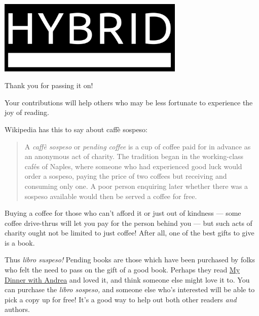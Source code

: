 \documentclass[12pt,letterpaper]{article}
\begin{document}
\thispagestyle{empty}

\begin{center}
\noindent\includegraphics[width=3.5in]{logo}

  \vspace{1cm}

{\huge Thank you for passing it on!}
\end{center}

Your contributions will help others who may be less fortunate to experience the joy of reading.

Wikipedia has this to say about caff\`{e} sospeso:

\begin{quote}
  A \emph{caff\`{e} sospeso} or \emph{pending coffee} is a cup of coffee paid for in advance as an anonymous act of charity. The tradition began in the working-class cafés of Naples, where someone who had experienced good luck would order a sospeso, paying the price of two coffees but receiving and consuming only one. A poor person enquiring later whether there was a sospeso available would then be served a coffee for free.
\end{quote}

Buying a coffee for those who can't afford it or just out of kindness --- some coffee drive-thrus will let you pay for the person behind you --- but such acts of charity ought not be limited to just coffee! After all, one of the best gifts to give is a book.

Thus \emph{libro suspeso!} Pending books are those which have been purchased by folks who felt the need to pass on the gift of a good book. Perhaps they read \href{https://hybrid.ink/my-dinner-with-andrea/}{My Dinner with Andrea} and loved it, and think someone else might love it to. You can purchase the \emph{libro sospeso,} and someone else who's interested will be able to pick a copy up for free! It's a good way to help out both other readers \emph{and} authors.
\end{document}
